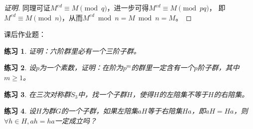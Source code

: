 \documentclass{article}
\newtheorem{Exercise}{练习}
\begin{document}
\begin{CJK*}{UTF8}{gbsn}
\begin{proof}[证明]
同理可证$M^{ed}\equiv M \pmod q$，进一步可得$M^{ed}\equiv M \pmod{pq}$，
即$M^{ed}\equiv M \pmod n$，从而$M^{ed} \bmod n = M\bmod n=M$。
\end{proof}
课后作业题：
\begin{Exercise}
证明：六阶群里必有一个三阶子群。
\end{Exercise}

\begin{Exercise}
设$p$为一个素数，证明：在阶为$p^m$的群里一定含有一个$p$阶子群，其中$m\geq 1$。
\end{Exercise}

\begin{Exercise}
在三次对称群$S_3$中，找一个子群$H$，使得$H$的左陪集不等于$H$的右陪集。
\end{Exercise}
\begin{Exercise}
设$H$为群$G$的一个子群，如果左陪集$aH$等于右陪集$Ha$，即$aH=Ha$，则$\forall h\in H, ah=ha$一定成立吗？
\end{Exercise}
\end{CJK*}
\end{document}
